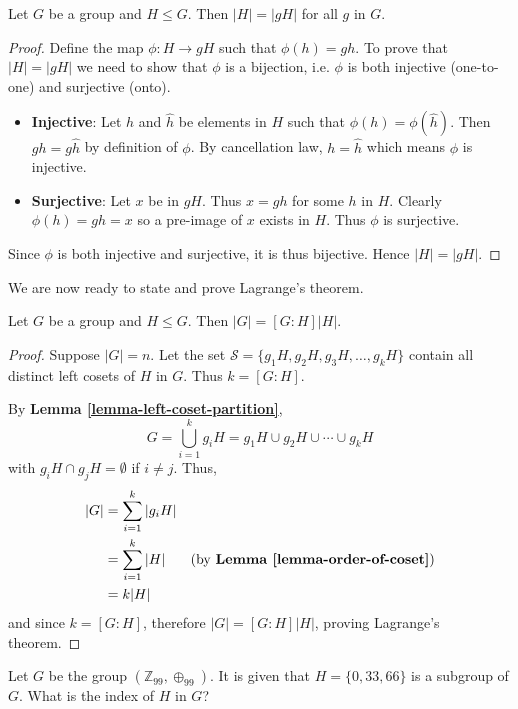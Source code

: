 \begin{lemma}\label{lemma-order-of-coset}
    Let $G$ be a group and $H \leq G$. Then $|H| = |gH|$ for all $g$ in $G$.
\end{lemma}
\begin{proof}
    Define the map $\phi: H \to gH$ such that $\phi(h) = gh$. To prove that $|H| = |gH|$ we need to show that $\phi$ is a bijection, i.e. $\phi$ is both injective (one-to-one) and surjective (onto).
    \begin{itemize}
        \item \textbf{Injective}: Let $h$ and $\hat{h}$ be elements in $H$ such that $\phi(h) = \phi(\hat{h})$. Then $gh = g\hat{h}$ by definition of $\phi$. By cancellation law, $h = \hat{h}$ which means $\phi$ is injective.
        \item \textbf{Surjective}: Let $x$ be in $gH$. Thus $x = gh$ for some $h$ in $H$. Clearly $\phi(h) = gh = x$ so a pre-image of $x$ exists in $H$. Thus $\phi$ is surjective.
    \end{itemize}
    Since $\phi$ is both injective and surjective, it is thus bijective. Hence $|H| = |gH|$.
\end{proof}

We are now ready to state and prove Lagrange's theorem.
\begin{theorem}[Lagrange]\label{thrm-lagrange}
    Let $G$ be a group and $H \leq G$. Then $|G| = [G:H]|H|$.
\end{theorem}
\begin{proof}
    Suppose $|G| = n$. Let the set $\mathcal{S} = \{g_1H, g_2H, g_3H, \dots, g_kH\}$ contain all distinct left cosets of $H$ in $G$. Thus $k = [G: H]$.

    By \textbf{Lemma \ref{lemma-left-coset-partition}},
    \[
        G = \bigcup_{i=1}^k g_iH = g_1H \cup g_2H \cup \cdots \cup g_kH
    \]
    with $g_iH \cap g_jH = \emptyset$ if $i \neq j$. Thus,
    \begin{align*}
        |G| &= \sum_{i=1}^k|g_iH|\\
        &=\sum_{i=1}^k|H| & (\text{by \textbf{Lemma \ref{lemma-order-of-coset}}})\\
        &= k|H|
    \end{align*}
    and since $k = [G: H]$, therefore $|G| = [G:H]|H|$, proving Lagrange's theorem.
\end{proof}

\begin{exercise}
    Let $G$ be the group $(\mathbb{Z}_{99}, \oplus_{99})$. It is given that $H = \{0, 33, 66\}$ is a subgroup of $G$. What is the index of $H$ in $G$?
\end{exercise}

